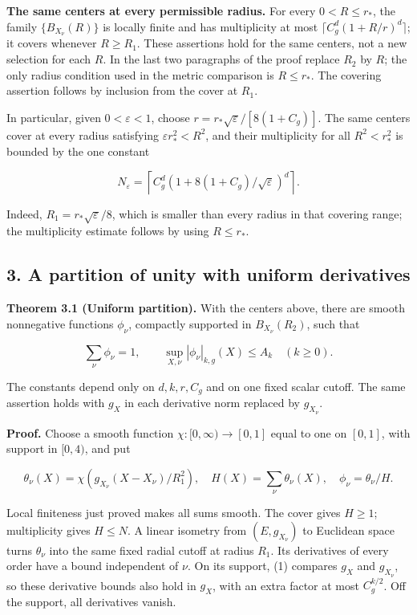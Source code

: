 \documentclass[
  11pt,
]{article}
\begin{document}
\textbf{The same centers at every permissible radius.} For every
\(0<R\leq r_*\), the family \(\{B_{X_\nu}(R)\}\) is locally finite and
has multiplicity at most \(\lceil C_g^d(1+R/r)^d\rceil\); it covers
whenever \(R\geq R_1\). These assertions hold for the same centers, not
a new selection for each \(R\). In the last two paragraphs of the proof
replace \(R_2\) by \(R\); the only radius condition used in the metric
comparison is \(R\leq r_*\). The covering assertion follows by inclusion
from the cover at \(R_1\).

In particular, given \(0<\varepsilon<1\), choose
\(r=r_*\sqrt\varepsilon/[8(1+C_g)]\). The same centers cover at every
radius satisfying \(\varepsilon r_*^2<R^2\), and their multiplicity for
all \(R^2<r_*^2\) is bounded by the one constant

\[
N_\varepsilon=\left\lceil C_g^d
\left(1+8(1+C_g)/\sqrt\varepsilon\right)^d\right\rceil.
\]

Indeed, \(R_1=r_*\sqrt\varepsilon/8\), which is smaller than every
radius in that covering range; the multiplicity estimate follows by
using \(R\leq r_*\).

\subsection{3. A partition of unity with uniform
derivatives}\label{a-partition-of-unity-with-uniform-derivatives}

\textbf{Theorem 3.1 (Uniform partition).} With the centers above, there
are smooth nonnegative functions \(\phi_\nu\), compactly supported in
\(B_{X_\nu}(R_2)\), such that

\[
\sum_\nu\phi_\nu=1,
\qquad
\sup_{X,\nu}|\phi_\nu|_{k,g}(X)\leq A_k
\quad(k\geq0).                                                   \tag{5}
\]

The constants depend only on \(d,k,r,C_g\) and on one fixed scalar
cutoff. The same assertion holds with \(g_X\) in each derivative norm
replaced by \(g_{X_\nu}\).

\textbf{Proof.} Choose a smooth function \(\chi:[0,\infty)\to[0,1]\)
equal to one on \([0,1]\), with support in \([0,4)\), and put

\[
\theta_\nu(X)=\chi\left(g_{X_\nu}(X-X_\nu)/R_1^2\right),
\quad H(X)=\sum_\nu\theta_\nu(X),
\quad\phi_\nu=\theta_\nu/H.                                     \tag{6}
\]

Local finiteness just proved makes all sums smooth. The cover gives
\(H\geq1\); multiplicity gives \(H\leq N\). A linear isometry from
\((E,g_{X_\nu})\) to Euclidean space turns \(\theta_\nu\) into the same
fixed radial cutoff at radius \(R_1\). Its derivatives of every order
have a bound independent of \(\nu\). On its support, (1) compares
\(g_X\) and \(g_{X_\nu}\), so these derivative bounds also hold in
\(g_X\), with an extra factor at most \(C_g^{k/2}\). Off the support,
all derivatives vanish.
\end{document}
